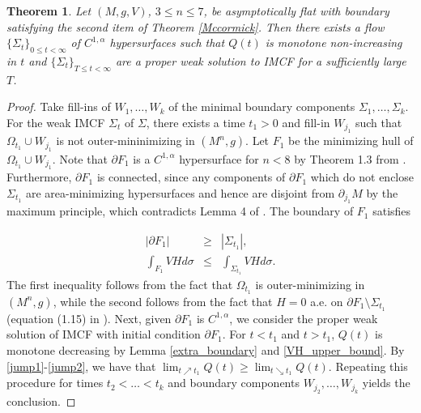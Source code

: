 \documentclass[12pt,twoside]{article}
\theoremstyle{plain}
\newtheorem{theorem}{Theorem}[section]
\theoremstyle{definition}
\theoremstyle{remark}
\numberwithin{equation}{section}
\begin{document}
\begin{theorem} \label{constructed_jumps}
Let $(M,g,V)$, $3 \leq n \leq 7$, be asymptotically flat  with boundary satisfying the second item of Theorem \ref{Mccormick}. Then there exists a flow $\{ \Sigma_{t} \}_{0 \leq t < \infty}$ of $C^{1,\alpha}$ hypersurfaces such that $Q(t)$ is monotone non-increasing in $t$ and $\{ \Sigma_{t} \}_{T \leq t < \infty}$ are a proper weak solution to IMCF for a sufficiently large $T$.
\end{theorem}
\begin{proof}
Take fill-ins of $W_{1}, \dots, W_{k}$ of the minimal boundary components $\Sigma_{1}, \dots, \Sigma_{k}$. For the weak IMCF $\Sigma_{t}$ of $\Sigma$, there exists a time $t_{1} > 0$ and fill-in $W_{j_{1}}$ such that $\Omega_{t_{1}} \cup W_{j_{1}}$ is not outer-mininimizing in $(M^{n},g)$. Let $F_{1}$ be the minimizing hull of $\Omega_{t_{1}} \cup W_{j_{1}}$. Note that $\partial F_{1}$ is a $C^{1,\alpha}$ hypersurface for $n < 8$ by Theorem 1.3 from \cite{HI}. Furthermore, $\partial F_{1}$ is connected, since any components of $\partial F_{1}$ which do not enclose $\Sigma_{t_{1}}$ are area-minimizing hypersurfaces and hence are disjoint from $\partial_{j_{1}} M$ by the maximum principle, which contradicts Lemma 4 of \cite{HMM}. The boundary of $F_{1}$ satisfies

\begin{eqnarray}
    |\partial F_{1}| &\geq& |\Sigma_{t_{1}}|, \label{jump1} \\
    \int_{F_{1}} VH d\sigma &\leq& \int_{\Sigma_{t_{1}}} VH d\sigma. \label{jump2}
\end{eqnarray}
The first inequality follows from the fact that $\Omega_{t_{1}}$ is outer-minimizing in $(M^{n},g)$, while the second follows from the fact that $H = 0$ a.e. on $\partial F_{1} \setminus \Sigma_{t_{1}}$ (equation (1.15) in \cite{HI}). Next, given $\partial F_{1}$ is $C^{1,\alpha}$, we consider the proper weak solution of IMCF with initial condition $\partial F_{1}$. For $t < t_{1}$ and $t > t_{1}$, $Q(t)$ is monotone decreasing by Lemma \ref{extra_boundary} and \eqref{VH_upper_bound}. By \eqref{jump1}-\eqref{jump2}, we have that $\lim_{t \nearrow t_{1}} Q(t) \geq \lim_{t \searrow t_{1}} Q(t)$. Repeating this procedure for times $t_{2} < \dots< t_{k}$ and boundary components $W_{j_{2}}, \dots, W_{j_{k}}$ yields the conclusion.  
\end{proof}
\end{document}
